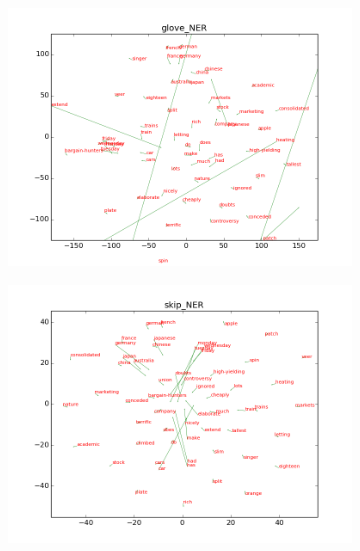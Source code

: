 \begin{figure}[h]
\begin{subfigure}{6cm}
    \includegraphics[scale=0.3]{plots/vectorField/glove_NER.png}
	\label{fig:bestchunking}
	\subcaption{}	
\end{subfigure}
\begin{subfigure}{6cm}
	\centering
    \includegraphics[scale=0.3]{plots/vectorField/skip_NER.png}
	\label{fig:bestchunking}
	\subcaption{}	
\end{subfigure}
\end{figure}


